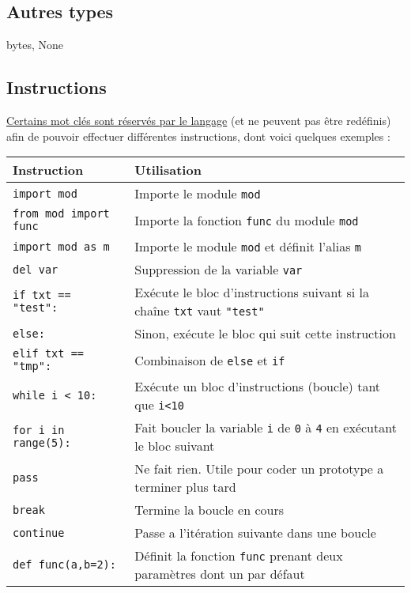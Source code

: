 \documentclass{article}
\begin{document}
\subsection*{Autres types}
bytes, None

\subsection*{Instructions}
\href{https://fr.wikibooks.org/wiki/Programmation_Python/Tableau_des_mots_r\%C3\%A9serv\%C3\%A9s}{Certains mot clés sont réservés par le langage} (et ne peuvent pas être redéfinis) afin de pouvoir effectuer différentes instructions, dont voici quelques exemples :

\begin{tabular}{|l|l|}
    \hline
    Instruction                     & Utilisation\\
    \hline
    \texttt{import mod}             & Importe le module \texttt{mod}\\
    \texttt{from mod import func}   & Importe la fonction \texttt{func} du module \texttt{mod}\\
    \texttt{import mod as m}        & Importe le module \texttt{mod} et définit l'alias \texttt{m}\\
    \texttt{del var}                & Suppression de la variable \texttt{var}\\
    \texttt{if txt == "test":}      & Exécute le bloc d'instructions suivant si la chaîne \texttt{txt} vaut \texttt{"test"}\\
    \texttt{else:}                  & Sinon, exécute le bloc qui suit cette instruction\\
    \texttt{elif txt == "tmp":}     & Combinaison de \texttt{else} et \texttt{if}\\
    \texttt{while i < 10:}          & Exécute un bloc d'instructions (boucle) tant que \texttt{i<10}\\
    \texttt{for i in range(5):}     & Fait boucler la variable \texttt{i} de \texttt{0} à \texttt{4} en exécutant le bloc suivant\\
    \texttt{pass}                   & Ne fait rien. Utile pour coder un prototype a terminer plus tard\\
    \texttt{break}                  & Termine la boucle en cours\\
    \texttt{continue}               & Passe a l'itération suivante dans une boucle\\
    \texttt{def func(a,b=2):}       & Définit la fonction \texttt{func} prenant deux paramètres dont un par défaut\\

\end{tabular}
\end{document}
